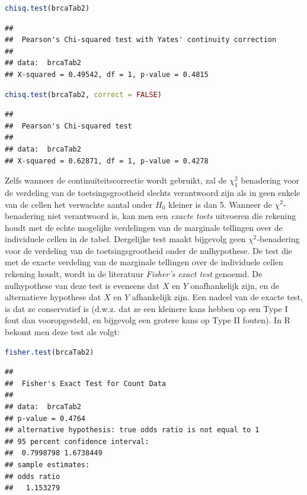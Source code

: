 \documentclass[
  12pt,dutch,coursenotes]{book}
\theoremstyle{definition}
\theoremstyle{definition}
\theoremstyle{definition}
\theoremstyle{definition}
\theoremstyle{remark}
\begin{document}
\begin{lstlisting}[language=R]
chisq.test(brcaTab2)
\end{lstlisting}

\begin{lstlisting}
## 
##  Pearson's Chi-squared test with Yates' continuity correction
## 
## data:  brcaTab2
## X-squared = 0.49542, df = 1, p-value = 0.4815
\end{lstlisting}

\begin{lstlisting}[language=R]
chisq.test(brcaTab2, correct = FALSE)
\end{lstlisting}

\begin{lstlisting}
## 
##  Pearson's Chi-squared test
## 
## data:  brcaTab2
## X-squared = 0.62871, df = 1, p-value = 0.4278
\end{lstlisting}

Zelfs wanneer de continuïteitscorrectie wordt gebruikt, zal de \(\chi^2_1\) benadering voor de verdeling van de toetsingsgrootheid slechts
verantwoord zijn als in geen enkele van de cellen het verwachte aantal onder
\(H_0\) kleiner is dan 5. Wanneer de \(\chi^2\)-benadering niet verantwoord
is, kan men een \emph{exacte toets} uitvoeren die rekening houdt met de
echte mogelijke verdelingen van de marginale tellingen over de individuele
cellen in de tabel. Dergelijke test maakt bijgevolg geen \(\chi^2\)-benadering voor de verdeling van de toetsingsgrootheid onder de
nulhypothese. De test die met de exacte verdeling van de marginale tellingen
over de individuele cellen rekening houdt, wordt in de literatuur \emph{Fisher's exact test} genoemd.
De nulhypothese van deze test is eveneens dat \(X\) en \(Y\) onafhankelijk zijn, en de alternatieve hypothese dat \(X\) en \(Y\)
afhankelijk zijn. Een nadeel van de exacte test, is dat ze conservatief
is (d.w.z. dat ze een kleinere kans hebben op een Type I fout dan
vooropgesteld, en bijgevolg een grotere kans op Type II fouten). In R bekomt men deze test als volgt:

\begin{lstlisting}[language=R]
fisher.test(brcaTab2)
\end{lstlisting}

\begin{lstlisting}
## 
##  Fisher's Exact Test for Count Data
## 
## data:  brcaTab2
## p-value = 0.4764
## alternative hypothesis: true odds ratio is not equal to 1
## 95 percent confidence interval:
##  0.7998798 1.6738449
## sample estimates:
## odds ratio 
##   1.153279
\end{lstlisting}
\end{document}
